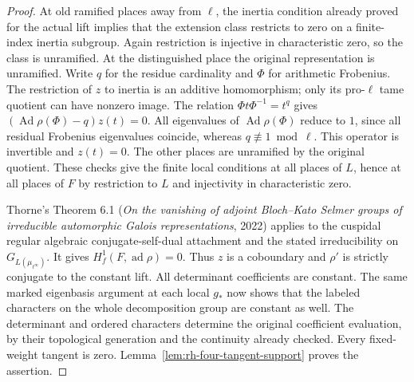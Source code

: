 \begin{proof}
At old ramified places away from $\ell$, the inertia condition
already proved for the actual lift implies that the extension
class restricts to zero on a finite-index inertia subgroup.
Again restriction is injective in characteristic zero, so the
class is unramified. At the distinguished place the original
representation is unramified. Write $q$ for the residue cardinality
and $\Phi$ for arithmetic Frobenius. The restriction of $z$ to
inertia is an additive homomorphism; only its pro-$\ell$ tame
quotient can have nonzero image. The relation
$\Phi t\Phi^{-1}=t^q$ gives
$(\operatorname{Ad}\rho(\Phi)-q)z(t)=0$.
All eigenvalues of $\operatorname{Ad}\rho(\Phi)$ reduce to $1$,
since all residual Frobenius eigenvalues coincide, whereas
$q\not\equiv1\bmod\ell$. This operator is invertible and $z(t)=0$.
The other places are unramified by the original quotient.
These checks give the finite local conditions at all places of
$L$, hence at all places of $F$ by restriction to $L$ and
injectivity in characteristic zero.

Thorne's Theorem 6.1 (\emph{On the vanishing of adjoint
Bloch--Kato Selmer groups of irreducible automorphic Galois
representations}, 2022) applies to the cuspidal regular algebraic
conjugate-self-dual attachment and the stated irreducibility on
$G_{L(\mu_{\ell^\infty})}$. It gives
$H^1_f(F,\operatorname{ad}\rho)=0$.
Thus $z$ is a coboundary and $\rho'$ is strictly conjugate to the
constant lift. All determinant coefficients are constant.
The same marked eigenbasis argument at each local $g_*$ now
shows that the labeled characters on the whole decomposition
group are constant as well. The determinant and ordered
characters determine the original coefficient evaluation, by
their topological generation and the continuity already checked.
Every fixed-weight tangent is zero.
Lemma~\ref{lem:rh-four-tangent-support} proves the assertion.
\end{proof}

